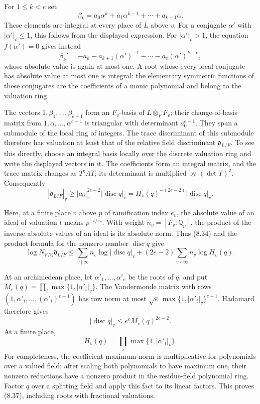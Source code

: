\documentclass[
  11pt,
  a4paper,
]{article}
\begin{document}
For \(1\le k<e\) set \[
\beta_k=a_0\alpha^k+a_1\alpha^{k-1}+\cdots+a_{k-1}\alpha.
\] These elements are integral at every place of \(L\) above \(v\). For
a conjugate \(\alpha'\) with \(|\alpha'|_v\le1\), this follows from the
displayed expression. For \(|\alpha'|_v>1\), the equation
\(f(\alpha')=0\) gives instead \[
\beta_k'=-a_k-a_{k+1}(\alpha')^{-1}
-\cdots-a_e(\alpha')^{k-e},
\] whose absolute value is again at most one. A root whose every local
conjugate has absolute value at most one is integral: the elementary
symmetric functions of these conjugates are the coefficients of a monic
polynomial and belong to the valuation ring.

The vectors \(1,\beta_1,\ldots,\beta_{e-1}\) form an \(F_v\)-basis of
\(L\otimes_F F_v\); their change-of-basis matrix from
\(1,\alpha,\ldots,\alpha^{e-1}\) is triangular with determinant
\(a_0^{e-1}\). They span a submodule of the local ring of integers. The
trace discriminant of this submodule therefore has valuation at least
that of the relative field discriminant \(\mathfrak d_{L/F}\). To see
this directly, choose an integral basis locally over the discrete
valuation ring and write the displayed vectors in it. The coefficients
form an integral matrix, and the trace matrix changes as
\(T^{\mathsf t}AT\); its determinant is multiplied by \((\det T)^2\).
Consequently \[
|\mathfrak d_{L/F}|_v
\ge |a_0|_v^{2e-2}|\operatorname{disc}q|_v
 =H_v(q)^{-(2e-2)}|\operatorname{disc}q|_v.
\tag{8.34}
\]

Here, at a finite place \(v\) above \(p\) of ramification index \(e_v\),
the absolute value of an ideal of valuation \(t\) means \(p^{-t/e_v}\).
With weight \(n_v=[F_v:\mathbb Q_p]\), the product of the inverse
absolute values of an ideal is its absolute norm. Thus (8.34) and the
product formula for the nonzero number \(\operatorname{disc}q\) give \[
\log N_{F/\mathbb Q}\mathfrak d_{L/F}
\le
\sum_{v\mid\infty}n_v\log|\operatorname{disc}q|_v
+(2e-2)\sum_{v\nmid\infty}n_v\log H_v(q).
\tag{8.35}
\]

At an archimedean place, let \(\alpha'_1,\ldots,\alpha'_e\) be the roots
of \(q\), and put \(M_v(q)=\prod_i\max\{1,|\alpha'_i|_v\}\). The
Vandermonde matrix with rows \((1,\alpha'_i,\ldots,(\alpha'_i)^{e-1})\)
has row norm at most \(\sqrt e\,\max\{1,|\alpha'_i|_v\}^{e-1}\).
Hadamard therefore gives \[
|\operatorname{disc}q|_v\le e^e M_v(q)^{2e-2}.
\tag{8.36}
\] At a finite place, \[
H_v(q)=\prod_i\max\{1,|\alpha'_i|_v\}.
\tag{8.37}
\] For completeness, the coefficient maximum norm is multiplicative for
polynomials over a valued field: after scaling both polynomials to have
maximum one, their nonzero reductions have a nonzero product in the
residue-field polynomial ring. Factor \(q\) over a splitting field and
apply this fact to its linear factors. This proves (8.37), including
roots with fractional valuations.
\end{document}
